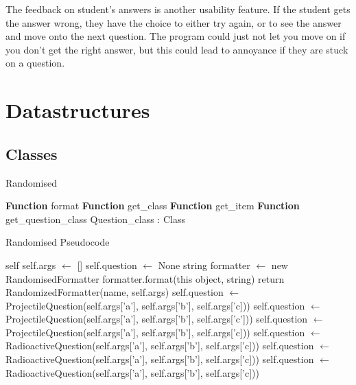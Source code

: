 The feedback on student's answers is another usability feature. If the student gets the answer wrong, they have the choice to either try again, or to see the answer and move onto the next question. The program could just not let you move on if you don't get the right answer, but this could lead to annoyance if they are stuck on a question.

\section{Datastructures}
\subsection{Classes}
\algrenewcommand{}
\begin{algorithm}[H]\label{randomised}
	\caption{Randomised}
	\begin{algorithmic}[1]
		\public
		\State \textbf{Function} format
		\State \textbf{Function} get\_class
		\State \textbf{Function} get\_item
		\State \textbf{Function} get\_question\_class 
		\endpublic
		\private
		\State Question\_class : Class
		\endprivate
		\EndProcedure
	\end{algorithmic}
\end{algorithm}
\begin{algorithm}[H]\label{randomisedps}
	\caption{Randomised Pseudocode}
	\begin{algorithmic}[1]
		 {self}
		\State self.args $\gets$ []
		\State self.question $\gets$ None
		\EndFunction
		 {string}
		\State formatter $\gets$ new RandomisedFormatter
		\State formatter.format(this object, string)
		\EndFunction
		\State return RandomizedFormatter(name, self.args)
		\EndFunction
		\State self.question $\gets$ ProjectileQuestion(self.args['a'], self.args['b'], self.args['c]))
		\EndIf
		\State self.question $\gets$ ProjectileQuestion(self.args['a'], self.args['b'], self.args['c']))
		\EndIf
		\State self.question $\gets$ ProjectileQuestion(self.args['a'], self.args['b'], self.args['c]))
		\EndIf
		\State self.question $\gets$ RadioactiveQuestion(self.args['a'], self.args['b'], self.args['c]))
		\EndIf
		\State self.question $\gets$ RadioactiveQuestion(self.args['a'], self.args['b'], self.args['c]))
		\EndIf
		\State self.question $\gets$ RadioactiveQuestion(self.args['a'], self.args['b'], self.args['c]))
		\EndIf
		\EndFunction
		\EndProcedure
	\end{algorithmic}
\end{algorithm}
